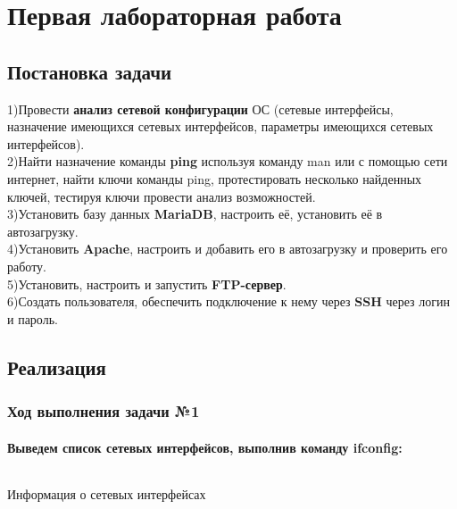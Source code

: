 \section{Первая лабораторная работа}


\subsection{Постановка задачи}
1)Провести \textbf{анализ сетевой конфигурации} ОС (сетевые интерфейсы, назначение имеющихся сетевых интерфейсов, параметры имеющихся сетевых интерфейсов).\\
2)Найти назначение команды \textbf{ping} используя команду man или с помощью сети интернет, найти ключи команды ping, протестировать несколько найденных ключей, тестируя ключи провести анализ возможностей.\\
3)Установить базу данных \textbf{MariaDB}, настроить её, установить её в автозагрузку.\\ 
4)Установить \textbf{Apache}, настроить и добавить его в автозагрузку и проверить его работу.\\ 
5)Установить, настроить и запустить \textbf{FTP-сервер}.\\ 
6)Создать пользователя, обеспечить подключение к нему через \textbf{SSH} через логин и пароль.

\subsection{Реализация}

\subsubsection{Ход выполнения задачи №1}

\paragraph{Выведем список сетевых интерфейсов, выполнив команду \textbf{ifconfig}:}

\begin{code}
	\inputminted[breaklines=true, xleftmargin=1em, linenos, frame=single, framesep=10pt, fontsize=\footnotesize, firstline=1, lastline=33]{haskell}{fig/ifconfig1.bash}
	\caption{Информация о сетевых интерфейсах }
\end{code}

